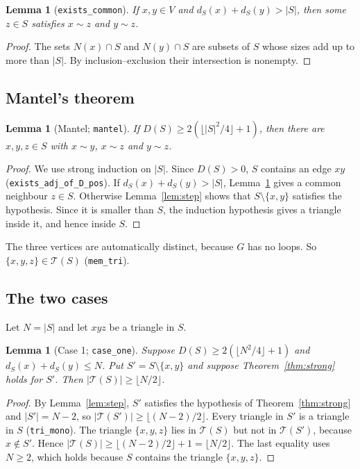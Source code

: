 \documentclass[11pt]{amsart}
\theoremstyle{plain}
\newtheorem{lemma}[theorem]{Lemma}
\theoremstyle{definition}
\newcommand{\Tri}{\mathcal{T}}
\newcommand{\adj}{\sim}
\newcommand{\lean}[1]{\texttt{#1}}
\begin{document}
\begin{lemma}[\lean{exists\_common}]\label{lem:common}
If $x,y\in V$ and $d_S(x)+d_S(y)>|S|$, then some $z\in S$ satisfies $x\adj z$ and $y\adj z$.
\end{lemma}
\begin{proof}
The sets $N(x)\cap S$ and $N(y)\cap S$ are subsets of $S$ whose sizes add up to more than $|S|$.
By inclusion--exclusion their intersection is nonempty.
\end{proof}

\subsection{Mantel's theorem}

\begin{lemma}[Mantel; \lean{mantel}]\label{lem:mantel}
If $D(S)\ge2(\lfloor|S|^2/4\rfloor+1)$, then there are $x,y,z\in S$ with $x\adj y$, $x\adj z$
and $y\adj z$.
\end{lemma}
\begin{proof}
We use strong induction on $|S|$. Since $D(S)>0$, $S$ contains an edge $xy$
(\lean{exists\_adj\_of\_D\_pos}). If $d_S(x)+d_S(y)>|S|$, Lemma~\ref{lem:common} gives a common
neighbour $z\in S$. Otherwise Lemma~\ref{lem:step} shows that $S\setminus\{x,y\}$ satisfies the
hypothesis. Since it is smaller than $S$, the induction hypothesis gives a triangle inside it,
and hence inside $S$.
\end{proof}

The three vertices are automatically distinct, because $G$ has no loops. So $\{x,y,z\}\in\Tri(S)$
(\lean{mem\_tri}).

\subsection{The two cases}

Let $N=|S|$ and let $xyz$ be a triangle in $S$.

\begin{lemma}[Case 1; \lean{case\_one}]\label{lem:case1}
Suppose $D(S)\ge2(\lfloor N^2/4\rfloor+1)$ and $d_S(x)+d_S(y)\le N$. Put $S'=S\setminus\{x,y\}$
and suppose Theorem~\ref{thm:strong} holds for $S'$. Then $|\Tri(S)|\ge\lfloor N/2\rfloor$.
\end{lemma}
\begin{proof}
By Lemma~\ref{lem:step}, $S'$ satisfies the hypothesis of Theorem~\ref{thm:strong} and
$|S'|=N-2$, so $|\Tri(S')|\ge\lfloor (N-2)/2\rfloor$. Every triangle in $S'$ is a triangle in $S$
(\lean{tri\_mono}). The triangle $\{x,y,z\}$ lies in $\Tri(S)$ but not in $\Tri(S')$, because
$x\notin S'$. Hence $|\Tri(S)|\ge\lfloor (N-2)/2\rfloor+1=\lfloor N/2\rfloor$. The last equality
uses $N\ge2$, which holds because $S$ contains the triangle $\{x,y,z\}$.
\end{proof}
\end{document}
